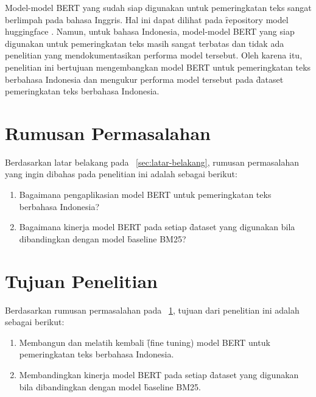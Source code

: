 Model-model BERT yang sudah siap digunakan untuk pemeringkatan teks sangat berlimpah pada bahasa Inggris. Hal ini dapat dilihat pada \f{repository} model huggingface \href{https://huggingface.co/sentence-transformers}{}. Namun, untuk bahasa Indonesia, model-model BERT yang siap digunakan untuk pemeringkatan teks masih sangat terbatas dan tidak ada penelitian yang mendokumentasikan performa model tersebut. Oleh karena itu, penelitian ini bertujuan mengembangkan model BERT untuk pemeringkatan teks berbahasa Indonesia dan mengukur performa model tersebut pada \f{dataset} pemeringkatan teks berbahasa Indonesia.

\section{Rumusan Permasalahan}
\label{sec:rumusan-permasalahan}
Berdasarkan  latar belakang pada \sect~\ref{sec:latar-belakang}, rumusan permasalahan yang ingin dibahas pada penelitian ini adalah sebagai berikut:
\begin{enumerate}
	\item Bagaimana pengaplikasian model BERT untuk pemeringkatan teks berbahasa Indonesia?
	\item Bagaimana kinerja model BERT pada setiap \f{dataset} yang digunakan bila dibandingkan dengan model \f{baseline} BM25?
\end{enumerate}

\section{Tujuan Penelitian}
Berdasarkan rumusan permasalahan pada \sect~\ref{sec:rumusan-permasalahan}, tujuan dari penelitian ini adalah sebagai berikut:
\begin{enumerate}
	\item Membangun dan melatih kembali \f{(fine tuning)} model BERT untuk pemeringkatan teks berbahasa Indonesia.
	\item Membandingkan kinerja model BERT pada setiap \f{dataset} yang digunakan bila dibandingkan dengan model \f{baseline} BM25.
\end{enumerate}

